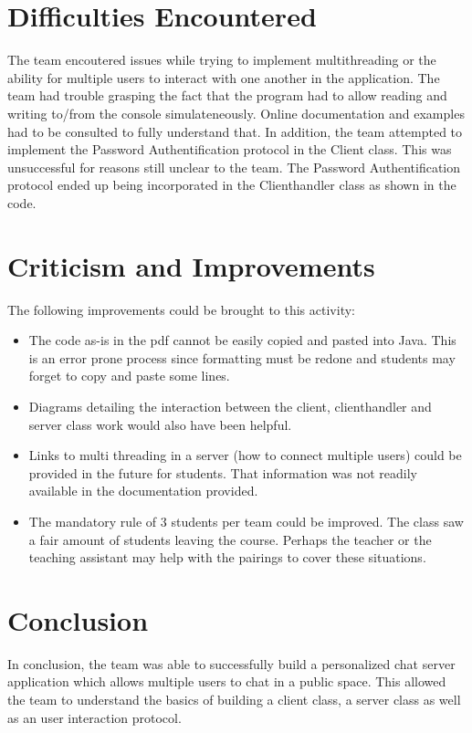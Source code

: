\documentclass[11pt,letterpaper]{article}
\begin{document}
\section{Difficulties Encountered}
The team encoutered issues while trying to implement multithreading or the ability for multiple users to interact with one another in the application. The team had trouble grasping the fact that the program had to allow reading and writing to/from the console simulateneously. Online documentation and examples had to be consulted to fully understand that. In addition, the team attempted to implement the Password Authentification protocol in the Client class. This was unsuccessful for reasons still unclear to the team.  The Password Authentification protocol ended up being incorporated in the Clienthandler class as shown in the code.


\section{Criticism and Improvements}
The following improvements could be brought to this activity:
\begin{itemize}
  \item The code as-is in the pdf cannot be easily copied and pasted into Java. This is an error prone process since formatting must be redone and students may forget to copy and paste some lines.
  \item Diagrams detailing the interaction between the client, clienthandler and server class work would also have been helpful.
  \item Links to multi threading in a server (how to connect multiple users) could be provided in the future for students. That information was not readily available in the documentation provided.
   \item The mandatory rule of 3 students per team could be improved. The class saw a fair amount of students leaving the course. Perhaps the teacher or the teaching assistant may help with the pairings to cover these situations.
\end{itemize}

\section{Conclusion}
In conclusion, the team was able to successfully build a personalized chat server application which allows multiple users to chat in a public space. This allowed the team to understand the basics of building a client class, a server class as well as an user interaction protocol.
\end{document}
